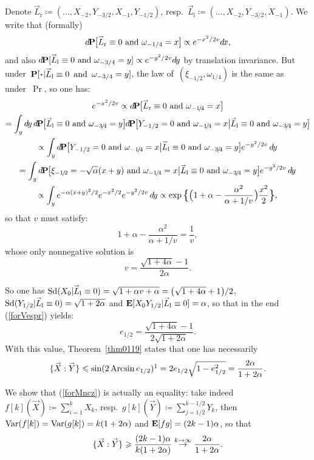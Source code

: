 \begin{Xpl}
Denote $\vec{L}_{\mathrm r} \coloneqq (\ldots,X_{-2},Y_{-3/2},X_{-1},Y_{-1/2})$,
resp.\ $\vec{L}_{\mathrm l} \coloneqq (\ldots,X_{-2},Y_{-3/2},X_{-1})$.
%
We write that (formally)
\[ \dx\Pr\big[ \vec{L}_{\mathrm r} \equiv0 \ \text{and} \ \omega_{-1/4} = x \big]
\propto e^{-x^2/2v} \dx{x}, \]
and also
$\dx\Pr[ \vec{L}_{\mathrm l} \equiv0 \ \text{and} \ \omega_{-3/4} = y]
\propto e^{-y^2/2v} \dx{y}$
by translation invariance.
But under~$\Pr[\Bcdot| \ab {\vec{L}_{\mathrm l} \equiv0} \enskip \text{and} \enskip {\omega_{-3/4} = y}]$,
the law of~$(\xi_{-1/2},\omega_{1/4})$ is the same as under~$\Pr$, so one has:
%
\begin{multline}
e^{-x^2/2v} \propto
\dx\Pr\big[ \vec{L}_{\mathrm r} \equiv0 \ \text{and} \ \omega_{-1\!/\!4} = x \big] \\
= \int_y \dx{y} \,
\dx\Pr\big[ \vec{L}_{\mathrm l} \equiv0 \ \text{and} \ \omega_{-3\!/\!4} = y \big]
\dx\Pr\big[ Y_{-1/2} = 0 \ \text{and} \ \omega_{-1\!/\!4} = x \big|
\vec{L}_{\mathrm l} \equiv0 \ \text{and} \ \omega_{-3\!/\!4} = y \big] \\
\propto \int_y \dx\Pr\big[ Y_{-1/2} = 0 \ \text{and} \ \omega_{-1\!/\!4} = x \big|
\vec{L}_{\mathrm l} \equiv0 \ \text{and} \ \omega_{-3\!/\!4} = y \big] e^{-y^2/2v} \,\dx{y} \\
= \int_y
\dx\Pr\big[ \xi_{-1\!/\!2} = -\sqrt{\alpha}(x+y) \ \text{and} \ \omega_{-1\!/\!4} = x \big|
\vec{L}_{\mathrm l} \equiv0 \ \text{and} \ \omega_{-3\!/\!4} = y \big]
e^{-y^2/2v} \,\dx{y} \\
\propto \int_y e^{-\alpha(x+y)^2/2} e^{-x^2/2} e^{-y^2/2v} \,\dx{y}
\propto \exp \Big\{ \Big( 1+\alpha-\frac{\alpha^2}{\alpha+1/v} \Big) \frac{x^2}{2} \Big\},
\end{multline}
so that $v$ must satisfy:
\[ 1+\alpha-\frac{\alpha^2}{\alpha+1/v} = \frac{1}{v} ,\]
whose only nonnegative solution is
\[ v = \frac{\sqrt{1+4\alpha}-1}{2\alpha} .\]

So one has $\ecty(X_0|\vec{L}_{\mathrm l} \equiv0) = \sqrt{1+\alpha v+\alpha}
= \big(\sqrt{1+4\alpha}+1\big)/2$,
$\ecty(Y_{1/2}|\vec{L}_{\mathrm l} \equiv0) = \sqrt{1+2\alpha}$
and $\EE[X_0Y_{1/2}|\vec{L}_{\mathrm l} \equiv0] = \alpha$,
so that in the end (\ref{forVespr}) yields:
\[\label{f3260} e_{1/2} = \frac{\sqrt{1+4\alpha}-1}{2\sqrt{1+2\alpha}} .\]
%
With this value, Theorem~\ref{thm0119} states that one has necessarily
\[\label{forMncz} \{ \vec{X} : \vec{Y} \} \leq \sin (2\arcsin e_{1/2}) \footnotemark
= 2 e_{1/2} \sqrt{1-e_{1/2}^2} = \frac{2\alpha}{1+2\alpha} .\]

We show that (\ref{forMncz}) is actually an equality:
take indeed~$f[k](\vec{X}) \coloneqq \sum_{i=1}^{k} X_k$,
resp.\ $g[k](\vec{Y}) \coloneqq \sum_{j=1/2}^{k-1/2} Y_k$,
then $\operatorname{Var}(f[k]) = \operatorname{Var}(g[k]) = k(1+2\alpha)$
and $\mathop{\smash{\mathbf{E}}}\nolimits[fg] = (2k-1)\alpha$,
so that
\[\label{f4151} \{ \vec{X} : \vec{Y} \} \geq \frac{(2k-1)\alpha}{k(1+2\alpha)} 
\stackrel{k\longto\infty}{\longto} \frac{2\alpha}{1+2\alpha} .\]
\end{Xpl}

